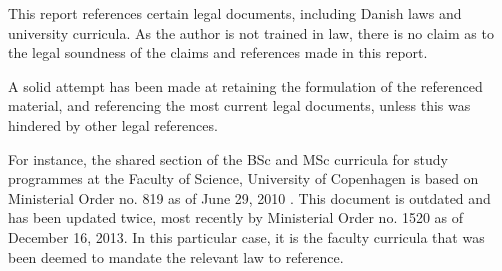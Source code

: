 This report references certain legal documents, including Danish laws and
university curricula. As the author is not trained in law, there is no claim as
to the legal soundness of the claims and references made in this report.

A solid attempt has been made at retaining the formulation of the referenced
material, and referencing the most current legal documents, unless this was
hindered by other legal references.

For instance, the shared section of the BSc and MSc curricula for study
programmes at the Faculty of Science, University of
Copenhagen\cite{faelles-del-2013} is based on Ministerial Order no. 819 as of
June 29, 2010 \cite{bek814}. This document is outdated and has been updated
twice, most recently by Ministerial Order no.  1520 as of December 16,
2013\cite{bek1520}. In this particular case, it is the faculty curricula that
was been deemed to mandate the relevant law to reference.
